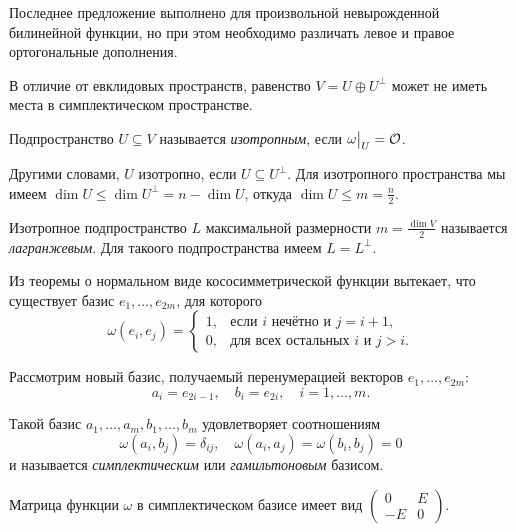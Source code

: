 \begin{remark}
    Последнее предложение выполнено для произвольной невырожденной билинейной функции, но при этом необходимо различать левое и правое ортогональные дополнения.
\end{remark}

В отличие от евклидовых пространств, равенство $V = U \oplus U^\perp$ может не иметь места в симплектическом пространстве.

\begin{definition}
    Подпространство $U \subseteq V$ называется \textit{изотропным}, если $\omega\big|_U = \mathcal{O}$.
\end{definition}

Другими словами, $U$ изотропно, если $U \subseteq U^\perp$. Для изотропного пространства мы имеем $\dim U \leqslant \dim U^\perp = n - \dim U$, откуда $\dim U \leqslant m = \frac{n}{2}$.

\begin{definition}
    Изотропное подпространство $L$ максимальной размерности $m = \frac{\dim V}{2}$ называется \textit{лагранжевым}. Для такоого подпространства имеем $L = L^\perp$.
\end{definition}

Из теоремы о нормальном виде кососимметрической функции вытекает, что существует базис $e_1, \ldots, e_{2m}$, для которого
\[
    \omega(e_i, e_j) =
    \begin{cases}
        1,&\text{если $i$ нечётно и $j = i + 1$},\\
        0,&\text{для всех остальных $i$ и $j > i$}.
    \end{cases}
\]

Рассмотрим новый базис, получаемый перенумерацией векторов $e_1, \ldots, e_{2m}$:
\[
    a_i = e_{2i - 1},\quad b_i = e_{2i},\quad i = 1, \ldots, m.
\]

\begin{definition}
    Такой базис $a_1, \ldots, a_m, b_1, \ldots, b_m$ удовлетворяет соотношениям
    \[
        \omega(a_i, b_j) = \delta_{ij},\quad\omega(a_i, a_j) = \omega(b_i, b_j) = 0
    \]
    и называется \textit{симплектическим} или \textit{гамильтоновым} базисом.
\end{definition}

Матрица функции $\omega$ в симплектическом базисе имеет вид
$
\begin{pmatrix}
    0 & E\\
    -E & 0
\end{pmatrix}
$.

